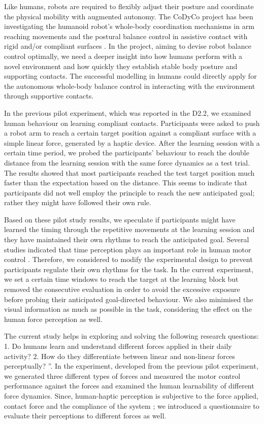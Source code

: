 Like humans, robots are required to flexibly adjust their posture and coordinate the physical mobility with augmented autonomy. The CoDyCo project has been investigating the humanoid robot’s whole-body coordination mechanisms in arm reaching movements and the postural balance control in assistive contact with rigid and/or compliant surfaces \cite{Azad2015}. In the project, aiming to devise robot balance control optimally, we need a deeper insight into how humans perform with a novel environment and how quickly they establish stable body posture and supporting contacts. The successful modelling in humans could directly apply for the autonomous whole-body balance control in interacting with the environment through supportive contacts.

In the previous pilot experiment, which was reported in the D2.2, we examined human behaviour on learning compliant contacts. Participants were asked to push a robot arm to reach a certain target position against a compliant surface with a simple linear force, generated by a haptic device. After the learning session with a certain time period, we probed the participants’ behaviour to reach the double distance from the learning session with the same force dynamics as a test trial. The results showed that most participants reached the test target position much faster than the expectation based on the distance. This seems to indicate that participants did not well employ the principle to reach the new anticipated goal; rather they might have followed their own rule.

Based on these pilot study results, we speculate if participants might have learned the timing through the repetitive movements at the learning session and they have maintained their own rhythms to reach the anticipated goal. Several studies indicated that time perception plays an important role in human motor control \cite{Berret2016, Goodbody1998, Rank2015}. Therefore, we considered to modify the experimental design to prevent participants regulate their own rhythms for the task. In the current experiment, we set a certain time windows to reach the target at the learning block but removed the consecutive evaluation in order to avoid the excessive exposure before probing their anticipated goal-directed behaviour. We also minimised the visual information as much as possible in the task, considering the effect on the human force perception as well.

The current study helps in exploring and solving the following research questions: 1. Do humans learn and understand different forces applied in their daily activity? 2. How do they differentiate between linear and non-linear forces perceptually? ”. In the experiment, developed from the previous pilot experiment, we generated three different types of forces and measured the motor control performance against the forces and examined the human learnability of different force dynamics. Since, human-haptic perception is subjective to the force applied, contact force and the compliance of the system \cite{van2014}; we introduced a questionnaire to evaluate their perceptions to different forces as well. 

